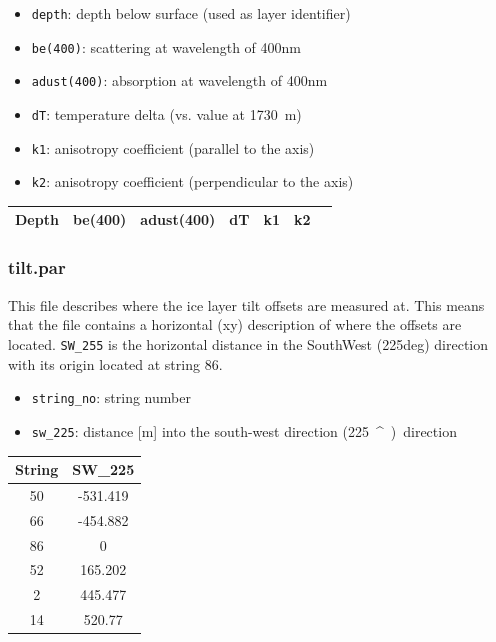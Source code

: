 \documentclass[a4paper,10pt]{scrartcl}
\begin{document}
\begin{itemize}
    \item \texttt{depth}: depth below surface (used as layer identifier)
    \item \texttt{be(400)}: scattering at wavelength of 400nm
    \item \texttt{adust(400)}: absorption at wavelength of 400nm
    \item \texttt{dT}: temperature delta (vs. value at \SI{1730}{m})
    \item \texttt{k1}: anisotropy coefficient (parallel to the axis)
    \item \texttt{k2}: anisotropy coefficient (perpendicular to the axis)
\end{itemize}

\begin{center}
    \begin{tabular}{ |c||c|c|c|c|c|c| }
        \hline
        Depth & be(400) & adust(400) & dT & k1 & k2 \\
        \hline
    \end{tabular}
\end{center}


\subsubsection*{tilt.par}

This file describes where the ice layer tilt offsets are measured at.
This means that the file contains a horizontal (xy) description of where the offsets are located.
\texttt{SW\_255} is the horizontal distance in the SouthWest (225deg) direction with its origin located at string 86.


\begin{itemize}
    \item \texttt{string\_no}: string number
    \item \texttt{sw\_225}: distance [m] into the south-west direction (\SI{225}{^\circ}) direction
\end{itemize}

\begin{center}
    \begin{tabular}{ |c|c| }
        \hline
        String & SW\_225  \\
        \hline
        50     & -531.419 \\
        66     & -454.882 \\
        86     & 0        \\
        52     & 165.202  \\
        2      & 445.477  \\
        14     & 520.77   \\
        \hline
    \end{tabular}
\end{center}
\end{document}
